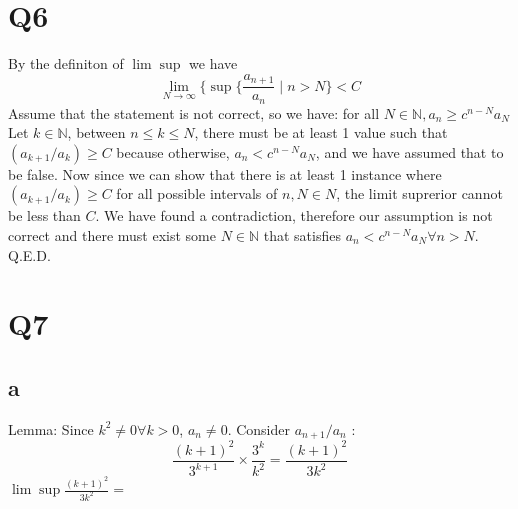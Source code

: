 \documentclass[12pt]{article}
\newcommand{\N}{\mathbb{N}}
\begin{document}
\section{Q6}
By the definiton of $\lim \sup$ we have $$\lim _{N \to \infty}\{\sup \{\frac{a_{n+1}}{a_n}\mid n>N\}< C$$
\newline
Assume that the statement is not correct, so we have: for all $N \in \N, a_n \geq c^{n-N}a_N$
\newline
Let $k \in \N$, between $n \leq k \leq N$, there must be at least 1 value such that $(a_{k+1}/a_k) \geq C$ because otherwise, $a_n < c^{n-N}a_N$, and we have assumed that to be false. Now since we can show that there is at least 1 instance where $(a_{k+1}/a_k) \geq C$ for all possible intervals of $n,N \in N$, the limit suprerior cannot be less than $C$. \lightning
\newline
We have found a contradiction, therefore our assumption is not correct and there must exist some $N \in \N$ that satisfies $a_n < c^{n-N}a_N \forall n>N$. Q.E.D.
\newpage


 \section{Q7}
\subsection{a}
Lemma: 
\newline
Since $k^2 \neq 0 \forall k>0$, $a_n \neq 0$. Consider $a_{n+1}/a_n$ :
$$\frac{(k+1)^2}{3^{k+1}}\times \frac{3^k}{k^2} = \frac{(k+1)^2}{3k^2}$$
$\lim \sup \frac{(k+1)^2}{3k^2} = $
\end{document}
